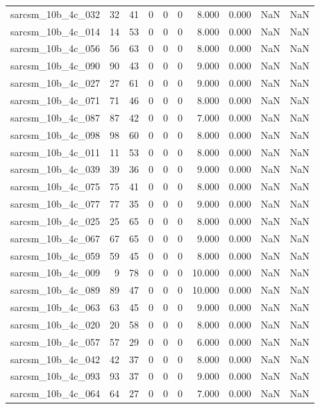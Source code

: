 \documentclass{article}
\begin{document}
\begin{longtable}{lrrrrrrrrr}
sarcsm\_10b\_4c\_032 & 32 & 41 & 0 & 0 & 0 & 8.000 & 0.000 & NaN & NaN \\
sarcsm\_10b\_4c\_014 & 14 & 53 & 0 & 0 & 0 & 8.000 & 0.000 & NaN & NaN \\
sarcsm\_10b\_4c\_056 & 56 & 63 & 0 & 0 & 0 & 8.000 & 0.000 & NaN & NaN \\
sarcsm\_10b\_4c\_090 & 90 & 43 & 0 & 0 & 0 & 9.000 & 0.000 & NaN & NaN \\
sarcsm\_10b\_4c\_027 & 27 & 61 & 0 & 0 & 0 & 9.000 & 0.000 & NaN & NaN \\
sarcsm\_10b\_4c\_071 & 71 & 46 & 0 & 0 & 0 & 8.000 & 0.000 & NaN & NaN \\
sarcsm\_10b\_4c\_087 & 87 & 42 & 0 & 0 & 0 & 7.000 & 0.000 & NaN & NaN \\
sarcsm\_10b\_4c\_098 & 98 & 60 & 0 & 0 & 0 & 8.000 & 0.000 & NaN & NaN \\
sarcsm\_10b\_4c\_011 & 11 & 53 & 0 & 0 & 0 & 8.000 & 0.000 & NaN & NaN \\
sarcsm\_10b\_4c\_039 & 39 & 36 & 0 & 0 & 0 & 9.000 & 0.000 & NaN & NaN \\
sarcsm\_10b\_4c\_075 & 75 & 41 & 0 & 0 & 0 & 8.000 & 0.000 & NaN & NaN \\
sarcsm\_10b\_4c\_077 & 77 & 35 & 0 & 0 & 0 & 9.000 & 0.000 & NaN & NaN \\
sarcsm\_10b\_4c\_025 & 25 & 65 & 0 & 0 & 0 & 8.000 & 0.000 & NaN & NaN \\
sarcsm\_10b\_4c\_067 & 67 & 65 & 0 & 0 & 0 & 9.000 & 0.000 & NaN & NaN \\
sarcsm\_10b\_4c\_059 & 59 & 45 & 0 & 0 & 0 & 8.000 & 0.000 & NaN & NaN \\
sarcsm\_10b\_4c\_009 & 9 & 78 & 0 & 0 & 0 & 10.000 & 0.000 & NaN & NaN \\
sarcsm\_10b\_4c\_089 & 89 & 47 & 0 & 0 & 0 & 10.000 & 0.000 & NaN & NaN \\
sarcsm\_10b\_4c\_063 & 63 & 45 & 0 & 0 & 0 & 9.000 & 0.000 & NaN & NaN \\
sarcsm\_10b\_4c\_020 & 20 & 58 & 0 & 0 & 0 & 8.000 & 0.000 & NaN & NaN \\
sarcsm\_10b\_4c\_057 & 57 & 29 & 0 & 0 & 0 & 6.000 & 0.000 & NaN & NaN \\
sarcsm\_10b\_4c\_042 & 42 & 37 & 0 & 0 & 0 & 8.000 & 0.000 & NaN & NaN \\
sarcsm\_10b\_4c\_093 & 93 & 37 & 0 & 0 & 0 & 9.000 & 0.000 & NaN & NaN \\
sarcsm\_10b\_4c\_064 & 64 & 27 & 0 & 0 & 0 & 7.000 & 0.000 & NaN & NaN \\

\end{longtable}
\end{document}
